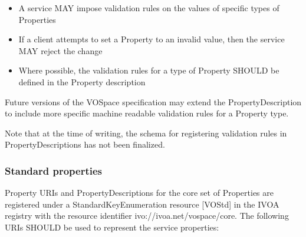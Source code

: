 \documentclass[11pt,a4paper]{ivoa}
\begin{document}
\begin{itemize}
    \item A service MAY impose validation rules on the values of specific types of Properties
    \item If a client attempts to set a Property to an invalid value, then the service MAY reject the change
    \item Where possible, the validation rules for a type of Property SHOULD be defined in the Property description
\end{itemize}

Future versions of the VOSpace specification may extend the PropertyDescription to include more specific machine readable validation rules for a Property type.

Note that at the time of writing, the schema for registering validation rules in PropertyDescriptions has not been finalized.

\subsubsection{Standard properties}
Property URIs and PropertyDescriptions for the core set of Properties are registered under a StandardKeyEnumeration resource [VOStd] in the IVOA registry with the resource identifier ivo://ivoa.net/vospace/core. The following URIs SHOULD be used to represent the service properties:
\end{document}
